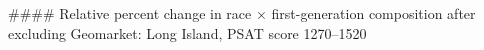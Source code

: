 #### Relative percent change in race × first-generation composition after excluding Geomarket: Long Island, PSAT score 1270–1520
